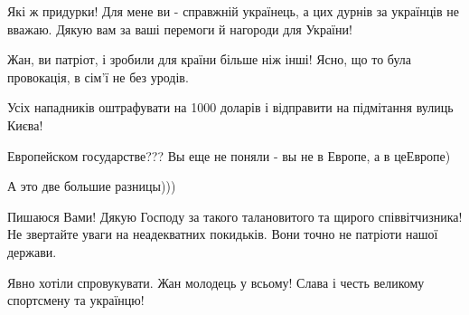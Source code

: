 \begin{itemize}
Які ж придурки! Для мене ви - справжній українець, а цих дурнів за українців не
вважаю. Дякую вам за ваші перемоги й нагороди для України!


 

Жан, ви патріот, і зробили для країни більше ніж інші! Ясно, що то була провокація, в сім'ї не без уродів.

 
Усіх нападників оштрафувати на 1000 доларів і відправити на підмітання вулиць Києва!

 

Европейском государстве??? Вы еще не поняли - вы не в Европе, а в цеЕвропе)

А это две большие разницы)))

 

Пишаюся Вами! Дякую Господу за такого талановитого та щирого співвітчизника! Не
звертайте уваги на неадекватних покидьків. Вони точно не патріоти нашої
держави.


 
Явно хотіли спровукувати. Жан молодець у всьому! Слава і честь великому спортсмену та українцю!

 


\end{itemize}
